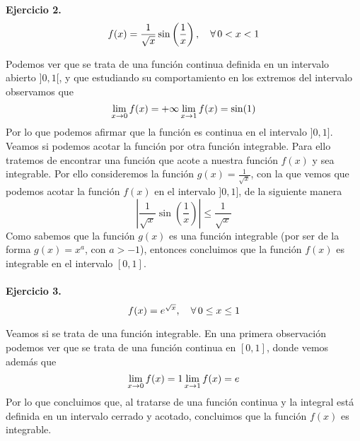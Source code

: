 \documentclass[fleqn]{article}
\begin{document}
    \newpage

    \textbf{Ejercicio 2.} \\
   
    $$f(x) = \frac{1}{\sqrt{x}}\sin \left( \frac{1}{x} \right), \quad \forall \thinspace 0 < x < 1$$
    
    Podemos ver que se trata de una función continua definida en un intervalo abierto $]0,1[$, y que estudiando su comportamiento en los extremos del intervalo 
    observamos que
    \begin{equation*}
        \lim_{x \to 0} f(x) = +\infty\\
        \lim_{x \to 1} f(x) = \sin(1)
    \end{equation*}
    Por lo que podemos afirmar que la función es continua en el intervalo $]0,1]$. Veamos si podemos acotar la función por otra función integrable. Para ello 
    tratemos de encontrar una función que acote a nuestra función $f(x)$ y sea integrable. Por ello consideremos la función $g(x) = \frac{1}{\sqrt{x}}$, con la que vemos que
    podemos acotar la función $f(x)$ en el intervalo $]0,1]$, de la siguiente manera
    $$\left| \frac{1}{\sqrt{x}}\sin \left( \frac{1}{x} \right) \right| \leq \frac{1}{\sqrt{x}}$$
    Como sabemos que la función $g(x)$ es una función integrable (por ser de la forma $g(x) = x^a$, con $a>-1$), entonces concluimos que la función $f(x)$ es integrable
    en el intervalo $[0,1]$.\\ \\

    \textbf{Ejercicio 3.} \\

    $$f(x) = e^{\sqrt{x}}, \quad \forall \thinspace 0 \leq x \leq 1$$

    Veamos si se trata de una función integrable. En una primera observación podemos ver que se trata de una función continua en $[0,1]$, donde vemos además que
    \begin{equation*}
        \lim_{x \to 0} f(x) = 1\\
        \lim_{x \to 1} f(x) = e
    \end{equation*}
    Por lo que concluimos que, al tratarse de una función continua y la integral está definida en un intervalo cerrado y acotado, concluimos que la función $f(x)$
    es integrable.

   
\end{document}
